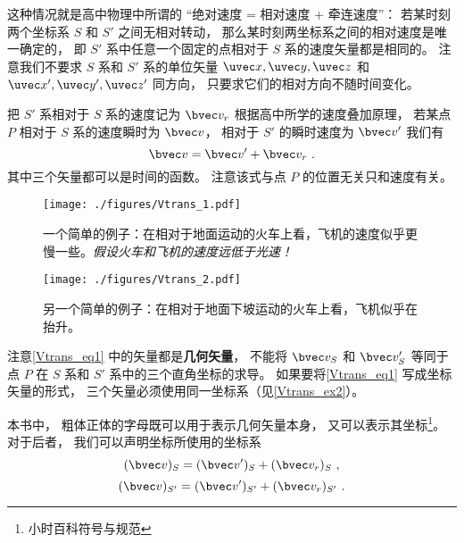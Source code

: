 


这种情况就是高中物理中所谓的 “绝对速度 = 相对速度 + 牵连速度”： 若某时刻两个坐标系 $S$ 和 $S'$ 之间无相对转动， 那么某时刻两坐标系之间的相对速度是唯一确定的， 即 $S'$ 系中任意一个固定的点相对于 $S$ 系的速度矢量都是相同的。 注意我们不要求 $S$ 系和 $S'$ 系的单位矢量 $\uvec x, \uvec y, \uvec z$ 和 $\uvec x', \uvec y', \uvec z'$ 同方向， 只要求它们的相对方向不随时间变化。

把 $S'$ 系相对于 $S$ 系的速度记为 $\bvec v_r$ 根据高中所学的速度叠加原理， 若某点 $P$ 相对于 $S$ 系的速度瞬时为 $\bvec v$， 相对于 $S'$ 的瞬时速度为 $\bvec v'$ 我们有
\begin{equation}\label{Vtrans_eq1}
\bvec v = \bvec v' + \bvec v_r~.
\end{equation}
其中三个矢量都可以是时间的函数。 注意该式与点 $P$ 的位置无关只和速度有关。

\begin{figure}[ht]
\centering
\texttt{[image: ./figures/Vtrans\_1.pdf]}
\caption{一个简单的例子：在相对于地面运动的火车上看，飞机的速度似乎更慢一些。\textsl{假设火车和飞机的速度远低于光速！}} \label{Vtrans_fig1}
\end{figure}

\begin{figure}[ht]
\centering
\texttt{[image: ./figures/Vtrans\_2.pdf]}
\caption{另一个简单的例子：在相对于地面下坡运动的火车上看，飞机似乎在抬升。} \label{Vtrans_fig2}
\end{figure}

注意\autoref{Vtrans_eq1} 中的矢量都是\textbf{几何矢量}， 不能将 $\bvec v_S$ 和 $\bvec v_S'$ 等同于点 $P$ 在 $S$ 系和 $S'$ 系中的三个直角坐标的求导。 如果要将\autoref{Vtrans_eq1} 写成坐标矢量的形式， 三个矢量必须使用同一坐标系（见\autoref{Vtrans_ex2}）。

本书中， 粗体正体的字母既可以用于表示几何矢量本身， 又可以表示其坐标\footnote{小时百科符号与规范}。 对于后者， 我们可以声明坐标所使用的坐标系
\begin{equation}\label{Vtrans_eq5}
(\bvec v)_{S} = (\bvec v')_{S} + (\bvec v_r)_{S}~,
\end{equation}
\begin{equation}\label{Vtrans_eq6}
(\bvec v)_{S'} = (\bvec v')_{S'} + (\bvec v_r)_{S'}~.
\end{equation}

